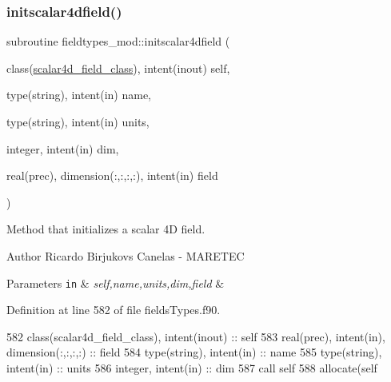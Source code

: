 \subsubsection{\texorpdfstring{initscalar4dfield()}{initscalar4dfield()}}
{\footnotesize\ttfamily subroutine fieldtypes\+\_\+mod\+::initscalar4dfield (\begin{DoxyParamCaption}\item[{class(\mbox{\hyperlink{structfieldtypes__mod_1_1scalar4d__field__class}{scalar4d\+\_\+field\+\_\+class}}), intent(inout)}]{self,  }\item[{type(string), intent(in)}]{name,  }\item[{type(string), intent(in)}]{units,  }\item[{integer, intent(in)}]{dim,  }\item[{real(prec), dimension(\+:,\+:,\+:,\+:), intent(in)}]{field }\end{DoxyParamCaption})\hspace{0.3cm}{\ttfamily [private]}}



Method that initializes a scalar 4D field. 

\begin{DoxyAuthor}{Author}
Ricardo Birjukovs Canelas -\/ M\+A\+R\+E\+T\+EC 
\end{DoxyAuthor}

\begin{DoxyParams}[1]{Parameters}
\mbox{\tt in}  & {\em self,name,units,dim,field} & \\
\hline
\end{DoxyParams}


Definition at line 582 of file fields\+Types.\+f90.


\begin{DoxyCode}
582     \textcolor{keywordtype}{class}(scalar4d\_field\_class), \textcolor{keywordtype}{intent(inout)} :: self
583     \textcolor{keywordtype}{real(prec)}, \textcolor{keywordtype}{intent(in)}, \textcolor{keywordtype}{dimension(:,:,:,:)} :: field
584     \textcolor{keywordtype}{type}(string), \textcolor{keywordtype}{intent(in)} :: name
585     \textcolor{keywordtype}{type}(string), \textcolor{keywordtype}{intent(in)} :: units
586     \textcolor{keywordtype}{integer}, \textcolor{keywordtype}{intent(in)} :: dim
587     \textcolor{keyword}{call }self%
588     \textcolor{keyword}{allocate}(self%
\end{DoxyCode}
\mbox{\label{namespacefieldtypes__mod_ad1af664e23793260f9c2fcd03829a1f5}} 
